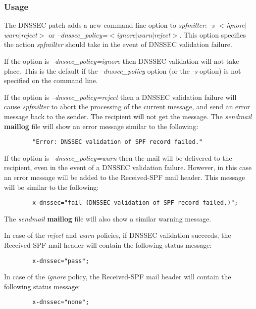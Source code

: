 \documentclass[12pt]{article}
\newcommand{\cmd}[1]{{\em #1}}
\newcommand{\path}[1]{{\bf #1}}
\begin{document}

\subsubsection{Usage}

The DNSSEC patch adds a new command line option to \cmd{spfmilter}:
{\it -s $<$ignore$|$warn$|$reject$>$} or
{\it --dnssec\_policy=$<$ignore$|$warn$|$reject$>$}.
This option specifies the action \cmd{spfmilter} should take in the
event of DNSSEC validation failure.

If the option is {\it --dnssec\_policy=ignore} then DNSSEC validation will not
take place.  This is the default if the {\it --dnssec\_policy} option (or the
{\it -s} option) is not specified on the command line.

If the option is {\it --dnssec\_policy=reject} then a DNSSEC validation
failure will cause \cmd{spfmilter} to abort the processing of the current
message, and send an error message back to the sender.  The recipient will
not get the message.  The \cmd{sendmail} \path{maillog} file will show an
error message similar to the following:
\begin{verbatim}
        "Error: DNSSEC validation of SPF record failed."
\end{verbatim}

If the option is {\it --dnssec\_policy=warn} then the mail will be delivered
to the recipient, even in the event of a DNSSEC validation failure.  However,
in this case an error message will be added to the Received-SPF mail header.
This message will be similar to the following:
\begin{verbatim}
        x-dnssec="fail (DNSSEC validation of SPF record failed.)";
\end{verbatim}

The \cmd{sendmail} \path{maillog} file will also show a similar warning message.

In case of the {\it reject} and {\it warn} policies, if DNSSEC validation
succeeds, the Received-SPF mail header will contain the following status
message:
\begin{verbatim}
        x-dnssec="pass";
\end{verbatim}

In case of the {\it ignore} policy, the Received-SPF mail header will contain
the following status message:

\begin{verbatim}
        x-dnssec="none";
\end{verbatim}
\end{document}
